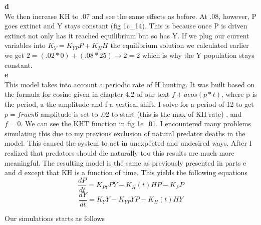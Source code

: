 \documentclass{article}
\begin{document}
  \textbf{d}\\
  We then increase KH to .07 and see the same effects as before. At .08, however,
  P goes extinct and Y stays constant (fig 1c\_14). This is because once P is driven extinct
  not only has it reached equilibrium but so has Y. If we plug our current variables into
   $K_{Y} = K_{YP}P + K_{H}H$ the equilibrium solution we calculated earlier
  we get $2 = (.02 * 0) + (.08 * 25) \to 2 = 2$ which is why the Y population stays constant.\\

  \textbf{e}\\
  This model takes into account a periodic rate of H hunting. It was built based on
  the formula for cosine given in chapter 4.2 of our text $f + a cos ( p * t)$,
  where p is the period, a the amplitude and f a vertical shift. I solve for a period of 12
  to get $p = frac{\pi}{6}$ amplitude is set to .02 to start (this is the max of KH rate)
  , and $f = 0$. We can see the KHT function in fig 1e\_01.
  I encountered many problems simulating this due to my previous exclusion of natural predator
  deaths in the model. This caused the system to act in unexpected and undesired ways.
  After I realized that predators should die naturally too this results are much more
  meaningful. The resulting model is the same as previously presented in parts e and d except
  that KH is a function of time. This yields the following equations\\

  \[
    \frac{dP}{dt} = K_{PY}PY - K_{H}(t)HP - K_{P}P
  \]
  \[
    \frac{dY}{dt} = K_{Y}Y - K_{YP}YP - K_{H}(t)HY
  \]

  \pagebreak
  Our simulations starts as follows\\
\end{document}

